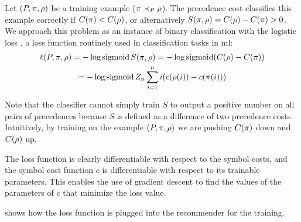 Let $(P, \pi, \rho)$ be a training example ($\pi \prec_{P} \rho$).
The precedence cost classifies this example correctly if $C(\pi) < C(\rho)$,
or alternatively $S(\pi, \rho) = C(\rho) - C(\pi) > 0$.
We approach this problem as an instance of binary classification with the logistic loss \cite{Mohri2018},
a loss function routinely used in classification tasks in \acrlong{ml}:
\begin{multline*}
\ell(P, \pi, \rho)
= - \log \operatorname{sigmoid} S(\pi, \rho)
= - \log \operatorname{sigmoid} (C(\rho) - C(\pi)) \\
= - \log \operatorname{sigmoid} Z_n \sum_{i=1}^n i (c(\rho(i)) - c(\pi(i)))
\end{multline*}

Note that the classifier cannot simply train $S$ to output a positive number on all pairs of precedences
because $S$ is defined as a difference of two precedence costs.
Intuitively, by training on the example $(P, \pi, \rho)$
we are pushing $C(\pi)$ down and $C(\rho)$ up.

The loss function is clearly differentiable with respect to the symbol costs,
and the symbol cost function $c$ is differentiable with respect to its trainable parameters.
This enables the use of gradient descent to find the values of the parameters of $c$
that minimize the loss value.

 shows how the loss function is plugged into the recommender for the training.

